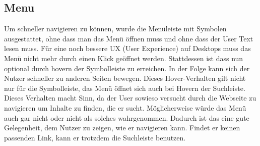 \subsection{Menu}
Um schneller navigieren zu können, wurde die Menüleiste mit Symbolen ausgestattet, ohne dass man das Menü öffnen muss und ohne dass der User Text lesen muss. Für eine noch bessere UX (User Experience) auf Desktops muss das Menü nicht mehr durch einen Klick geöffnet werden. Stattdessen ist dass nun optional durch hovern der Symbolleiste zu erreichen. In der Folge kann sich der Nutzer schneller zu anderen Seiten bewegen. Dieses Hover-Verhalten gilt nicht nur für die Symbolleiste, das Menü öffnet sich auch bei Hovern der Suchleiste. Dieses Verhalten macht Sinn, da der User sowieso versucht durch die Webseite zu navigieren um Inhalte zu finden, die er sucht. 
Möglicherweise würde das Menü auch gar nicht oder nicht als solches wahrgenommen. Dadurch ist das eine gute Gelegenheit, dem Nutzer zu zeigen, wie er navigieren kann. Findet er keinen passenden Link, kann er trotzdem die Suchleiste benutzen.
